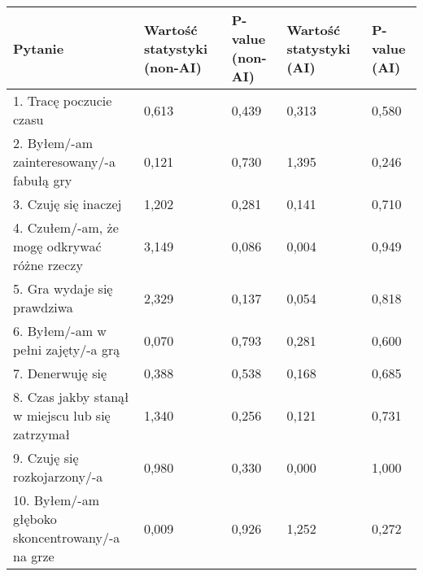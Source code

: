 \begin{table}[!h]
    \begin{center}
        \begin{tabular}{|m{10em}|m{5em}|m{5em}|m{5em}|m{5em}|}
            \hline
            Pytanie                                                           & Wartość statystyki (non-AI) & P-value (non-AI) & Wartość statystyki (AI) & P-value (AI) \\
            \hline
            1. Tracę poczucie czasu                                           & 0,613                       & 0,439            & 0,313                   & 0,580        \\
            2. Byłem/-am \newline zainteresowany/-a fabułą gry                & 0,121                       & 0,730            & 1,395                   & 0,246        \\
            3. Czuję się inaczej                                              & 1,202                       & 0,281            & 0,141                   & 0,710        \\
            4. Czułem/-am, że mogę odkrywać różne rzeczy                      & 3,149                       & 0,086            & 0,004                   & 0,949        \\
            5. Gra wydaje się prawdziwa                                       & 2,329                       & 0,137            & 0,054                   & 0,818        \\
            6. Byłem/-am \newline w pełni zajęty/-a grą                       & 0,070                       & 0,793            & 0,281                   & 0,600        \\
            7. Denerwuję się                                                  & 0,388                       & 0,538            & 0,168                   & 0,685        \\
            8. Czas jakby stanął w miejscu lub się zatrzymał                  & 1,340                       & 0,256            & 0,121                   & 0,731        \\
            9. Czuję się \newline rozkojarzony/-a                             & 0,980                       & 0,330            & 0,000                   & 1,000        \\
            10. Byłem/-am głęboko \newline skoncentrowany/-a \newline na grze & 0,009                       & 0,926            & 1,252                   & 0,272        \\

\end{tabular}
\end{center}
\end{table}
